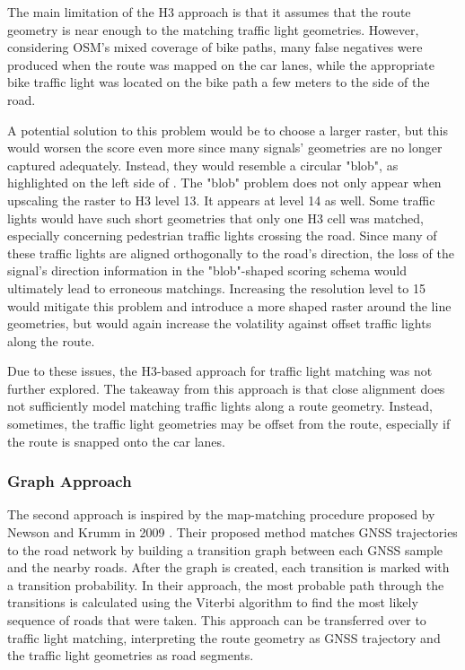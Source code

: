 The main limitation of the H3 approach is that it assumes that the route geometry is near enough to the matching traffic light geometries. However, considering OSM's mixed coverage of bike paths, many false negatives were produced when the route was mapped on the car lanes, while the appropriate bike traffic light was located on the bike path a few meters to the side of the road. 

A potential solution to this problem would be to choose a larger raster, but this would worsen the score even more since many signals' geometries are no longer captured adequately. Instead, they would resemble a circular "blob", as highlighted on the left side of . The "blob" problem does not only appear when upscaling the raster to H3 level 13. It appears at level 14 as well. Some traffic lights would have such short geometries that only one H3 cell was matched, especially concerning pedestrian traffic lights crossing the road. Since many of these traffic lights are aligned orthogonally to the road's direction, the loss of the signal's direction information in the "blob"-shaped scoring schema would ultimately lead to erroneous matchings. Increasing the resolution level to 15 would mitigate this problem and introduce a more shaped raster around the line geometries, but would again increase the volatility against offset traffic lights along the route.

Due to these issues, the H3-based approach for traffic light matching was not further explored. The takeaway from this approach is that close alignment does not sufficiently model matching traffic lights along a route geometry. Instead, sometimes, the traffic light geometries may be offset from the route, especially if the route is snapped onto the car lanes.

\subsubsection{Graph Approach}

The second approach is inspired by the map-matching procedure proposed by Newson and Krumm in 2009 \cite{newson_hidden_2009}. Their proposed method matches GNSS trajectories to the road network by building a transition graph between each GNSS sample and the nearby roads. After the graph is created, each transition is marked with a transition probability. In their approach, the most probable path through the transitions is calculated using the Viterbi algorithm to find the most likely sequence of roads that were taken. This approach can be transferred over to traffic light matching, interpreting the route geometry as GNSS trajectory and the traffic light geometries as road segments.

